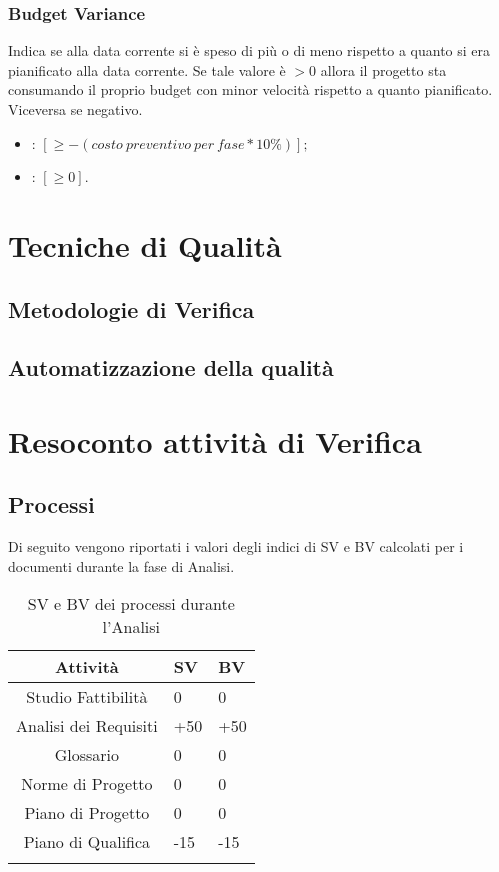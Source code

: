 \subsubsection{Budget Variance}
\label{4.3.2}
Indica se alla data corrente si è speso di più o di meno rispetto a quanto si era pianificato alla data corrente. Se tale valore è $>0$ allora il progetto sta consumando il proprio budget con minor velocità rispetto a quanto pianificato. Viceversa se negativo.
\begin{itemize}
\item {}: $[\geq -(costo\:preventivo\:per\:fase * 10\%)];$
\item {}: $[\geq 0].$
\end{itemize}
\newpage
\section{Tecniche di Qualità}
\label{5.0}
\subsection{Metodologie di Verifica}
\label{5.1}
\subsection{Automatizzazione della qualità}
\label{5.2}

\newpage
\section{Resoconto attività di Verifica}
\label{6.0}

\subsection{Processi}
\label{6.1}
Di seguito vengono riportati i valori degli indici di SV e BV calcolati per i documenti durante la fase di Analisi.

\begin{longtable}{|c|p{3cm}|p{3cm}|}
\toprule
\textbf{Attività} & \textbf{SV} & \textbf{BV} \\


\midrule
Studio Fattibilità & 0 & 0\\
\midrule
Analisi dei Requisiti & +50 & +50\\
\midrule
Glossario & 0 & 0\\
\midrule
Norme di Progetto & 0 & 0\\
\midrule
Piano di Progetto & 0 & 0\\
\midrule
Piano di Qualifica & -15 & -15 \\
\bottomrule
\caption{SV e BV dei processi durante l'Analisi}
\label{tab:changelog}
\end{longtable}

